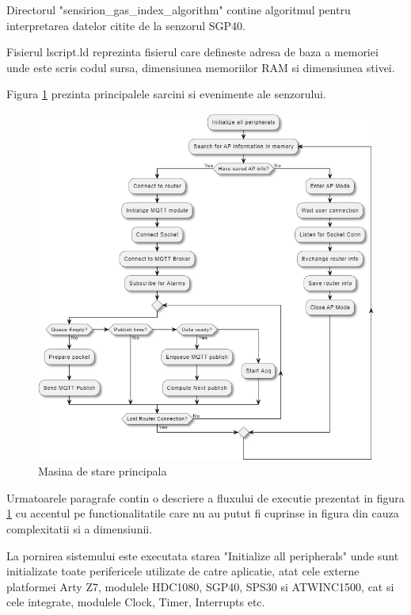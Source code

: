 Directorul "sensirion\_gas\_index\_algorithm" contine algoritmul pentru interpretarea datelor citite de la senzorul SGP40.

Fisierul lscript.ld reprezinta fisierul care defineste adresa de baza a memoriei unde este scris codul sursa, dimensiunea memoriilor RAM si dimensiunea stivei.

Figura \ref{fig:PI_MainStateMachine} prezinta principalele sarcini si evenimente ale senzorului.
\begin{figure}[H]
    \centering
    \includegraphics[scale=0.66]{figs/PI_MainStateMachine.png}
    \caption{Masina de stare principala}
    \label{fig:PI_MainStateMachine}
\end{figure}

Urmatoarele paragrafe contin o descriere a fluxului de executie prezentat in figura \ref{fig:PI_MainStateMachine} cu accentul pe functionalitatile care nu au putut 
fi cuprinse in figura din cauza complexitatii si a dimensiunii. 

La pornirea sistemului este executata starea "Initialize all peripherals" unde sunt initializate toate perifericele utilizate de catre aplicatie, atat cele externe 
platformei Arty Z7, modulele HDC1080, SGP40, SPS30 si ATWINC1500, cat si cele integrate, modulele Clock, Timer, Interrupts etc.


